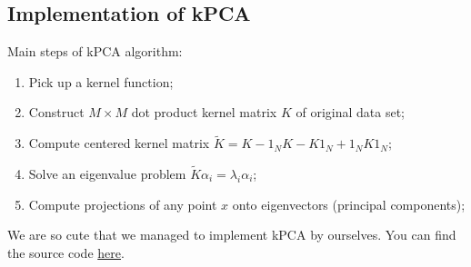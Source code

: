 \subsection{Implementation of kPCA}
Main steps of kPCA algorithm:
\begin{enumerate}
	\item Pick up a kernel function;
	\item Construct $M \times M$ dot product kernel matrix $K$ of original data set;
	\item Compute centered kernel matrix $\widetilde{K} = K - 1_NK - K1_N + 1_NK1_N$;
	\item Solve an eigenvalue problem $\widetilde{K}\alpha_i = \lambda_i\alpha_i$;
	\item Compute projections of any point $x$ onto eigenvectors (principal components);
\end{enumerate}
We are so cute that we managed to implement kPCA by ourselves. You can find the source code \href{https://github.com/Irynei/KernelPCA}{here}.

